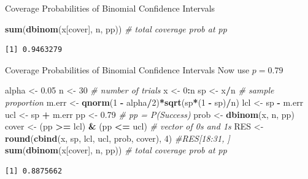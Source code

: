 \documentclass[
  ignorenonframetext,
]{beamer}
\newenvironment{Shaded}{\begin{snugshade}}{\end{snugshade}}
\newcommand{\CommentTok}[1]{\textcolor[rgb]{0.56,0.35,0.01}{\textit{#1}}}
\newcommand{\DecValTok}[1]{\textcolor[rgb]{0.00,0.00,0.81}{#1}}
\newcommand{\FloatTok}[1]{\textcolor[rgb]{0.00,0.00,0.81}{#1}}
\newcommand{\FunctionTok}[1]{\textcolor[rgb]{0.13,0.29,0.53}{\textbf{#1}}}
\newcommand{\NormalTok}[1]{#1}
\newcommand{\OtherTok}[1]{\textcolor[rgb]{0.56,0.35,0.01}{#1}}
\newcommand{\SpecialCharTok}[1]{\textcolor[rgb]{0.81,0.36,0.00}{\textbf{#1}}}
\begin{document}
\begin{frame}[fragile]{Coverage Probabilities of Binomial Confidence
Intervals}
\begin{Shaded}
\begin{Highlighting}[]
\FunctionTok{sum}\NormalTok{(}\FunctionTok{dbinom}\NormalTok{(x[cover], n, pp))  }\CommentTok{\# total coverage prob at pp}
\end{Highlighting}
\end{Shaded}

\begin{verbatim}
[1] 0.9463279
\end{verbatim}

\normalsize
\end{frame}

\begin{frame}[fragile]{Coverage Probabilities of Binomial Confidence
Intervals}
\protect\hypertarget{coverage-probabilities-of-binomial-confidence-intervals-4}{}
Now use \(p=0.79\) \tiny

\begin{Shaded}
\begin{Highlighting}[]
\NormalTok{alpha }\OtherTok{\textless{}{-}} \FloatTok{0.05}
\NormalTok{n }\OtherTok{\textless{}{-}} \DecValTok{30}   \CommentTok{\# number of trials}
\NormalTok{x }\OtherTok{\textless{}{-}} \DecValTok{0}\SpecialCharTok{:}\NormalTok{n  }
\NormalTok{sp }\OtherTok{\textless{}{-}}\NormalTok{ x}\SpecialCharTok{/}\NormalTok{n }\CommentTok{\# sample proportion}
\NormalTok{m.err }\OtherTok{\textless{}{-}} \FunctionTok{qnorm}\NormalTok{(}\DecValTok{1} \SpecialCharTok{{-}}\NormalTok{ alpha}\SpecialCharTok{/}\DecValTok{2}\NormalTok{)}\SpecialCharTok{*}\FunctionTok{sqrt}\NormalTok{(sp}\SpecialCharTok{*}\NormalTok{(}\DecValTok{1} \SpecialCharTok{{-}}\NormalTok{ sp)}\SpecialCharTok{/}\NormalTok{n)}
\NormalTok{lcl }\OtherTok{\textless{}{-}}\NormalTok{ sp }\SpecialCharTok{{-}}\NormalTok{ m.err}
\NormalTok{ucl }\OtherTok{\textless{}{-}}\NormalTok{ sp }\SpecialCharTok{+}\NormalTok{ m.err}
\NormalTok{pp }\OtherTok{\textless{}{-}} \FloatTok{0.79}   \CommentTok{\# pp = P(Success)}
\NormalTok{prob }\OtherTok{\textless{}{-}} \FunctionTok{dbinom}\NormalTok{(x, n, pp)}
\NormalTok{cover }\OtherTok{\textless{}{-}}\NormalTok{ (pp }\SpecialCharTok{\textgreater{}=}\NormalTok{ lcl) }\SpecialCharTok{\&}\NormalTok{ (pp }\SpecialCharTok{\textless{}=}\NormalTok{ ucl)  }\CommentTok{\# vector of 0s and 1s}
\NormalTok{RES }\OtherTok{\textless{}{-}} \FunctionTok{round}\NormalTok{(}\FunctionTok{cbind}\NormalTok{(x, sp, lcl, ucl, prob, cover), }\DecValTok{4}\NormalTok{)}
\CommentTok{\#RES[18:31, ]}
\FunctionTok{sum}\NormalTok{(}\FunctionTok{dbinom}\NormalTok{(x[cover], n, pp))  }\CommentTok{\# total coverage prob at pp}
\end{Highlighting}
\end{Shaded}

\begin{verbatim}
[1] 0.8875662
\end{verbatim}

\normalsize
\end{frame}
\end{document}

